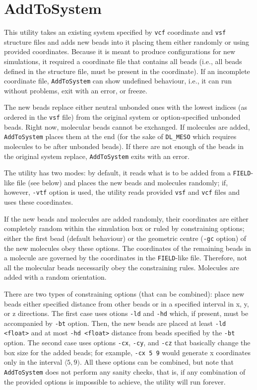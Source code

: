\section{AddToSystem} \label{sec:AddToSystem}

This utility takes an existing system specified by \texttt{vcf} coordinate
and \texttt{vsf} structure files and adds new beads into it placing them
either randomly or using provided coordinates. Because it is meant to
produce configurations for new simulations, it required a coordinate file
that contains all beads (i.e., all beads defined in the structure file,
must be present in the coordinate). If an incomplete coordinate file,
\texttt{AddToSystem} can show undefined behaviour, i.e., it can run without
problems, exit with an error, or freeze.

The new beads replace either neutral unbonded ones with the lowest indices
(as ordered in the \texttt{vsf} file) from the original system or
option-specified unbonded beads. Right now, molecular beads cannot be
exchanged. If molecules are added, \texttt{AddToSystem} places them at the
end (for the sake of \texttt{DL\_MESO} which requires molecules to be after
unbonded beads). If there are not enough of the beads in the original system
replace, \texttt{AddToSystem} exits with an error.

The utility has two modes: by default, it reads what is to be added from a
\texttt{FIELD}-like file (see below) and places the new beads and molecules
randomly; if, however, \texttt{-vtf} option is used, the utility reads
provided \texttt{vsf} and \texttt{vcf} files and uses these coordinates.

If the new beads and molecules are added randomly, their coordinates are
either completely random within the simulation box or ruled by constraining
options; either the first bead (default behaviour) or the geometric centre
(\texttt{-gc} option) of the new molecules obey these options. The
coordinates of the remaining beads in a molecule are governed by the
coordinates in the \texttt{FIELD}-like file. Therefore, not all the
molecular beads necessarily obey the constraining rules. Molecules are
added with a random orientation.

There are two types of constraining options (that can be combined): place
new beads either specified distance from other beads or in a specified
interval in x, y, or z directions. The first case uses otions \texttt{-ld}
and \texttt{-hd} which, if present, must be accompanied by \texttt{-bt}
option.  Then, the new beads are placed at least \texttt{-ld <float>} and
at most \texttt{-hd <float>} distance from beads specified by the
\texttt{-bt} option. The second case uses options \texttt{-cx},
\texttt{-cy}, and \texttt{-cz} that basically change the box size for the
added beads; for example, \texttt{-cx 5 9} would generate x coordinates
only in the interval $\langle5,9)$. All these options can be combined, but note that
\texttt{AddToSystem} does not perform any sanity checks, that is, if any
combination of the provided options is impossible to achieve, the utility
will run forever.

